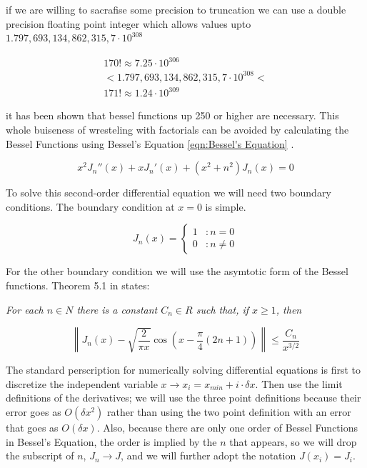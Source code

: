 \documentclass[twocolumn, groupedaddress]{revtex4-1}
\begin{document}
if we are willing to sacrafise some precision to truncation we can use a double precision floating point integer which allows values upto $1.797,693,134,862,315,7 \cdot 10^{308}$

\begin{align}
170! \approx 7.25 \cdot 10^{306}				\\
< 1.797,693,134,862,315,7 \cdot 10^{308} < 	\\
171! \approx 1.24 \cdot 10^{309}
\end{align}

it has been shown that bessel functions up 250 or higher are necessary.  This whole buiseness of wresteling with factorials can be avoided by calculating the Bessel Functions using Bessel's Equation \ref{eqn:Bessel's Equation} \citep{folland}.

\begin{equation}
\label{eqn:Bessel's Equation}
x^2 J_n''(x) + x J_n'(x) + (x^2 + n^2) J_n(x) = 0
\end{equation}

To solve this second-order differential equation we will need two boundary conditions.  The boundary condition at $x=0$ is simple.

\begin{displaymath}
   J_n(x) = \left\{
     \begin{array}{lr}
       1 & : n = 0     \\
       0 & : n \neq 0
     \end{array}
   \right.
\end{displaymath}

For the other boundary condition we will use the asymtotic form of the Bessel functions.  Theorem 5.1 in \cite{folland} states:

\textit{For each $n \in N$ there is a constant $C_n \in R$ such that, if $x \geq 1$, then}

\begin{equation}
\left\| J_n(x) - \sqrt{\frac{2}{\pi x}} \cos \left( x - \frac{\pi}{4} (2n+1) \right) \right\| \leq \frac{C_n}{x^{3/2}}
\end{equation}

The standard perscription for numerically solving differential equations is first to discretize the independent variable $x \to x_i = x_{min} + i \cdot \delta x$.  Then use the limit definitions of the derivatives; we will use the three point definitions because their error goes as $O(\delta x^2)$ rather than using the two point definition with an error that goes as $O(\delta x)$.  Also, because there are only one order of Bessel Functions in Bessel's Equation, the order is implied by the $n$ that appears, so we will drop the subscript of $n$, $J_n \to J$, and we will further adopt the notation $J(x_i) = J_i$.
\end{document}
